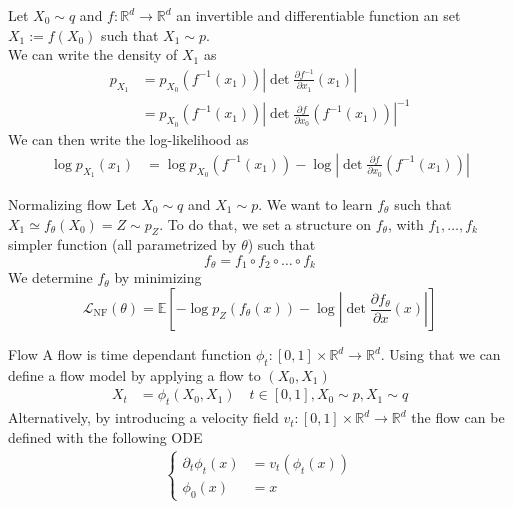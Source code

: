 \documentclass{beamer}
\begin{document}
\begin{frame}
    Let \(X_0\sim q\) and \(f:\mathbb{R}^d\rightarrow\mathbb{R}^d\) an invertible and differentiable function an set  \(X_1:=f(X_0)\) such that \(X_1\sim p\).\\
    We can write the density of \(X_1\) as
    \begin{align}
        p_{X_1} &= p_{X_0}(f^{-1}(x_1))\left| \det \frac{\partial f^{-1}}{\partial x_1}(x_1)\right|\\
        &= p_{X_0}(f^{-1}(x_1))\left| \det \frac{\partial f}{\partial x_0}(f^{-1}(x_1))\right|^{-1} 
    \end{align}
    We can then write the log-likelihood as
    \begin{align}
        \log p_{X_1}(x_1) &= \log p_{X_0}(f^{-1}(x_1))-\log \left| \det \frac{\partial f}{\partial x_0}(f^{-1}(x_1))\right|
    \end{align}
\end{frame}

\begin{frame}{Normalizing flow}
    Let \(X_0\sim q\) and \(X_1\sim p\). We want to learn \(f_\theta\) such that \(X_1 \simeq f_\theta(X_0)=Z\sim p_Z\). To do that, we set a structure on \(f_\theta\), with \(f_1,\ldots,f_k\) simpler function (all parametrized by \(\theta\)) such that 
    \[f_\theta=f_1\circ f_2\circ\ldots\circ f_k\] 
    We determine \(f_\theta\) by minimizing 
    \[\mathcal{L}_\text{NF}(\theta)= \mathbb{E}\left[-\log p_Z(f_\theta(x))-\log \left|\det \frac{\partial f_\theta}{\partial x}(x)\right|\right]\]
\end{frame}

\begin{frame}{Flow}
    A flow is time dependant function \(\phi_t:[0,1]\times\mathbb{R}^d\rightarrow\mathbb{R}^d\). Using that we can define a flow model by applying a flow to  \((X_0,X_1)\)
    \begin{align}
        X_t &= \phi_t(X_0,X_1) \quad t\in[0,1],X_0\sim p, X_1\sim q 
    \end{align}
    Alternatively, by introducing a velocity field \(v_t:[0,1]\times\mathbb{R}^d\rightarrow\mathbb{R}^d\) the flow can be defined with the following ODE
    \begin{align}\label{ODE}
        \left\{
            \begin{array}{ll}
                \partial_t \phi_t(x)&=v_t(\phi_t(x))\\
                \phi_0(x)&=x 
            \end{array}
        \right.
    \end{align}
        
\end{frame}
\end{document}
